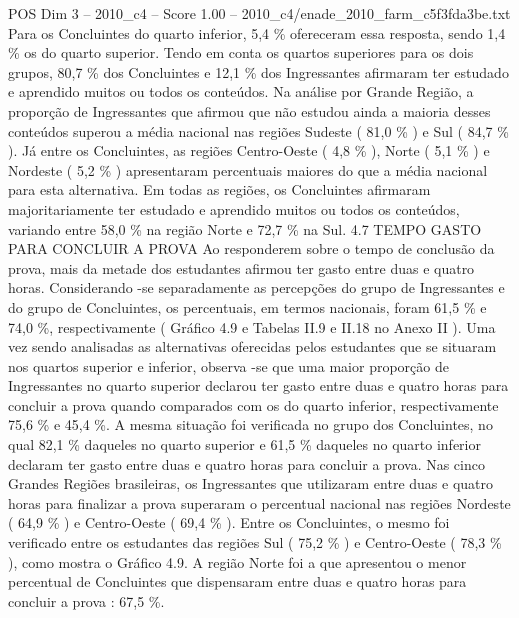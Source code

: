 \begin{textsample}{POS Dim 3 – 2010\_c4 – Score 1.00 – 2010\_c4/enade\_2010\_farm\_c5f3fda3be.txt}
Para os Concluintes do quarto inferior, 5,4 \% ofereceram essa resposta, sendo 1,4 \% os do quarto superior.
Tendo em conta os quartos superiores para os dois grupos, 80,7 \% dos Concluintes e 12,1 \% dos Ingressantes afirmaram ter estudado e aprendido muitos ou todos os conteúdos.
Na análise por Grande Região, a proporção de Ingressantes que afirmou que não estudou ainda a maioria desses conteúdos superou a média nacional nas regiões Sudeste ( 81,0 \% ) e Sul ( 84,7 \% ).
Já entre os Concluintes, as regiões Centro-Oeste ( 4,8 \% ), Norte ( 5,1 \% ) e Nordeste ( 5,2 \% ) apresentaram percentuais maiores do que a média nacional para esta alternativa.
Em todas as regiões, os Concluintes afirmaram majoritariamente ter estudado e aprendido muitos ou todos os conteúdos, variando entre 58,0 \% na região Norte e 72,7 \% na Sul. 4.7 TEMPO GASTO PARA CONCLUIR A PROVA Ao responderem sobre o tempo de conclusão da prova, mais da metade dos estudantes afirmou ter gasto entre duas e quatro horas.
Considerando -se separadamente as percepções do grupo de Ingressantes e do grupo de Concluintes, os percentuais, em termos nacionais, foram 61,5 \% e 74,0 \%, respectivamente ( Gráfico 4.9 e Tabelas II.9 e II.18 no Anexo II ).
Uma vez sendo analisadas as alternativas oferecidas pelos estudantes que se situaram nos quartos superior e inferior, observa -se que uma maior proporção de Ingressantes no quarto superior declarou ter gasto entre duas e quatro horas para concluir a prova quando comparados com os do quarto inferior, respectivamente 75,6 \% e 45,4 \%.
A mesma situação foi verificada no grupo dos Concluintes, no qual 82,1 \% daqueles no quarto superior e 61,5 \% daqueles no quarto inferior declaram ter gasto entre duas e quatro horas para concluir a prova.
Nas cinco Grandes Regiões brasileiras, os Ingressantes que utilizaram entre duas e quatro horas para finalizar a prova superaram o percentual nacional nas regiões Nordeste ( 64,9 \% ) e Centro-Oeste ( 69,4 \% ).
Entre os Concluintes, o mesmo foi verificado entre os estudantes das regiões Sul ( 75,2 \% ) e Centro-Oeste ( 78,3 \% ), como mostra o Gráfico 4.9.
A região Norte foi a que apresentou o menor percentual de Concluintes que dispensaram entre duas e quatro horas para concluir a prova : 67,5 \%.

\end{textsample}
